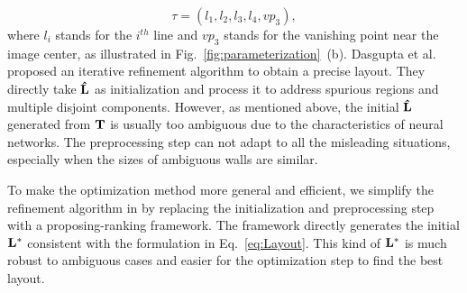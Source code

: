 \begin{equation}
	\label{eq:Layout}
	\tau = (l_1, l_2, l_3, l_4, vp_3),
\end{equation}
%
where $l_{i}$ stands for the $i^{th}$ line and $vp_3$ stands for the vanishing point near the image center, as illustrated in Fig.~\ref{fig:parameterization}~(b).
%
Dasgupta et al.~\cite{dasgupta2016delay} proposed an iterative refinement algorithm to obtain a precise layout. 
They directly take $\mathbf{\hat{L}}$ as initialization and process it to address spurious regions and multiple disjoint components. 
However, as mentioned above, the initial $\mathbf{\hat{L}}$ generated from $\mathbf{T}$ is usually too ambiguous due to the characteristics of neural networks. 
The preprocessing step can not adapt to all the misleading situations, especially when the sizes of ambiguous walls are similar. 

To make the optimization method more general and efficient, we simplify the refinement algorithm in \cite{dasgupta2016delay} by replacing the initialization and preprocessing step with a proposing-ranking framework. The framework directly generates the initial $\mathbf{L^*}$ consistent with the formulation in Eq.~\ref{eq:Layout}. This kind of $\mathbf{L^*}$ is much robust to ambiguous cases and easier for the optimization step to find the best layout.

